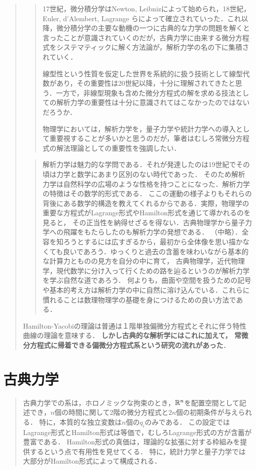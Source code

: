 \documentclass[uplatex, dvipdfmx]{jsreport}
\begin{document}
\begin{abstract}
\begin{quotation}
        17世紀，微分積分学はNewton, Leibnizによって始められ，18世紀，Euler, d'Alembert, Lagrange らによって確立されていった．これ以降，微分積分学の主要な動機の一つに古典的な力学の問題を解くと言ったことが意識されていくのだが，古典力学に由来する微分方程式をシステマティックに解く方法論が，解析力学の名の下に集積されていく．
    
        線型性という性質を仮定した世界を系統的に扱う技術として線型代数があり，その重要性は20世紀以降，十分に理解されてきたと思う．一方で，非線型現象も含めた微分方程式の解を求める技法としての解析力学の重要性は十分に意識されてはこなかったのではないだろうか．
    
        物理学においては，解析力学を，量子力学や統計力学への導入として重要視することが多いかと思うのだが，筆者はむしろ常微分方程式の解法理論としての重要性を強調したい．
    \end{quotation}
    \begin{quotation}
        解析力学は魅力的な学問である．それが発達したのは19世紀でその頃は力学と数学にあまり区別のない時代であった．
        そのため解析力学は自然科学の広場のような性格を持つことになった．解析力学の特徴はその数学的形式である．
        ここの運動の様子よりもそれらの背後にある数学的構造を教えてくれるからである．実際，物理学の重要な方程式がLagrange形式やHamilton形式を通じて導かれるのを見ると，
        その正当性を納得せざるを得ない．古典物理学から量子力学への飛躍をもたらしたのも解析力学の発想である．
        （中略）．全容を知ろうとするには広すぎるから，最初から全体像を思い描かなくても良いであろう．ゆっくりと過去の含蓄を味わいながら基本的な計算力とものの見方を自分の中に育て，
        古典物理学，近代物理学，現代数学に分け入って行くための路を辿るというのが解析力学を学ぶ自然な道であろう．
        何よりも，曲面や空間を扱うための記号や基本的考え方は解析力学の中に自然に溶け込んでいる．これらに慣れることは数理物理学の基礎を身につけるための良い方法である．
    \end{quotation}
    Hamilton-Yacobiの理論は普通は１階単独偏微分方程式とそれに伴う特性曲線の理論を意味する．
    \textbf{しかし古典的な解析学にはこれに加えて，
    常微分方程式に帰着できる偏微分方程式系という研究の流れがあった}．
\end{abstract}

\chapter{古典力学}

\begin{quotation}
    古典力学での系は，ホロノミックな拘束のとき，$\mathbb{R}^n$を配置空間として記述でき，$n$個の時間に関して2階の微分方程式と$2n$個の初期条件が与えられる．
    特に，本質的な独立変数は$n$個の$q_i$のみである．
    この設定ではLagrange形式とHamilton形式は等価で，むしろLagrange形式の方が含蓄が豊富である．
    Hamilton形式の真価は，理論的な拡張に対する枠組みを提供するという点で有用性を見せてくる．
    特に，統計力学と量子力学では大部分がHamilton形式によって構成される．
\end{quotation}
\end{document}
